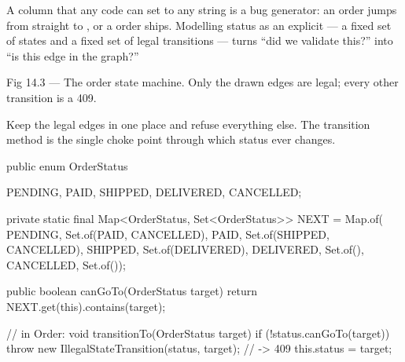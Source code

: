  A  column that any code can set to any string is a bug generator: an order jumps from  straight to , or a  order ships. Modelling status as an explicit  --- a fixed set of states and a fixed set of legal transitions --- turns ``did we validate this?'' into ``is this edge in the graph?''

\begin{wbfigure}{Fig 14.3 --- The order state machine. Only the drawn edges are legal; every other transition is a 409.}
\end{wbfigure}

 Keep the legal edges in one place and refuse everything else. The transition method is the single choke point through which status ever changes.

\begin{javabox}
public enum OrderStatus {
  PENDING, PAID, SHIPPED, DELIVERED, CANCELLED;

  private static final Map<OrderStatus, Set<OrderStatus>> NEXT = Map.of(
    PENDING, Set.of(PAID, CANCELLED),
    PAID,    Set.of(SHIPPED, CANCELLED),
    SHIPPED, Set.of(DELIVERED),
    DELIVERED, Set.of(),
    CANCELLED, Set.of());

  public boolean canGoTo(OrderStatus target) {
    return NEXT.get(this).contains(target);
  }
}
// in Order:
void transitionTo(OrderStatus target) {
  if (!status.canGoTo(target))
    throw new IllegalStateTransition(status, target);  // -> 409
  this.status = target;
}
\end{javabox}

